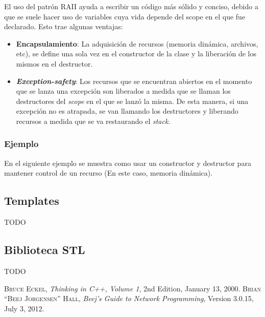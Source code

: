 \documentclass[a4paper, twoside]{article}
\newcommand{\codedir}{../resources/code} %
\begin{document}
El uso del patrón RAII ayuda a escribir un código más sólido y conciso, debido a que se suele hacer uso de variables cuya vida depende del scope en el que fue declarado. Esto trae algunas ventajas:

\begin{itemize}
	\item \textbf{Encapsulamiento}: La adquisición de recursos (memoria dinámica, archivos, etc), se define una sola vez en el constructor de la clase y la liberación de los mismos en el destructor.
	\item \emph{\textbf{Exception-safety}}: Los recursos que se encuentran abiertos en el momento que se lanza una excepción son liberados a medida que se llaman los destructores del \emph{scope} en el que se lanzó la misma. De esta manera, si una excepción no es atrapada, se van llamando los destructores y liberando recursos a medida que se va restaurando el \emph{stack}.
\end{itemize}

\newpage
\subsubsection{Ejemplo}
En el siguiente ejemplo se muestra como usar un constructor y destructor para mantener control de un recurso (En este caso, memoria dinámica).



\subsection{Templates}
TODO %

\subsection{Biblioteca STL}
TODO %

\newpage
\newcommand{\bibliographyname}{Bibliografía} %
\addcontentsline{toc}{section}{\bibliographyname} %
\renewcommand\refname{\bibliographyname} %
\begin{thebibliography}{X}
	 \textsc{Bruce Eckel}, \textit{Thinking in C++, Volume 1}, 2nd Edition, January 13, 2000.
	 \textsc{Brian “Beej Jorgensen” Hall}, \textit{Beej's Guide to Network Programming}, Version 3.0.15, July 3, 2012.
\end{thebibliography}

\makeseccioncolaboradores %

\makehistorial
\end{document}
